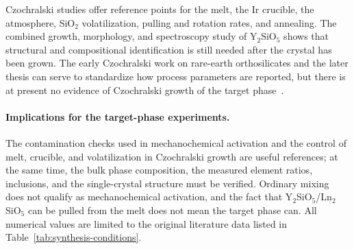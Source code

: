Czochralski studies offer reference points for the melt, the Ir crucible, the atmosphere, SiO$_2$ volatilization, pulling and rotation rates, and annealing. The combined growth, morphology, and spectroscopy study of Y$_2$SiO$_5$ shows that structural and compositional identification is still needed after the crystal has been grown. The early Czochralski work on rare-earth orthosilicates and the later thesis can serve to standardize how process parameters are reported, but there is at present no evidence of Czochralski growth of the target phase~\cite{pang2005study,shoudu1999czochralski,brandle1986czochralski,alizadeh2021spectroscopy}.

\paragraph{Implications for the target-phase experiments.} The contamination checks used in mechanochemical activation and the control of melt, crucible, and volatilization in Czochralski growth are useful references; at the same time, the bulk phase composition, the measured element ratios, inclusions, and the single-crystal structure must be verified. Ordinary mixing does not qualify as mechanochemical activation, and the fact that Y$_2$SiO$_5$\slash Ln$_2$SiO$_5$ can be pulled from the melt does not mean the target phase can. All numerical values are limited to the original literature data listed in Table~\ref{tab:synthesis-conditions}.
